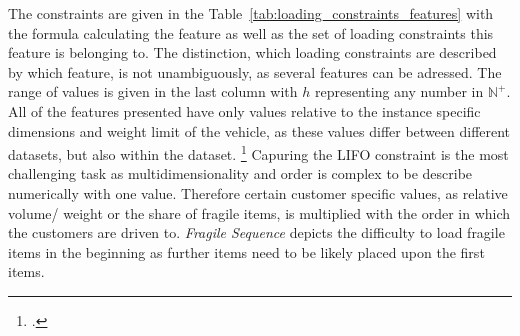 The constraints are given in the Table~\ref{tab:loading_constraints_features} with the formula calculating the feature as well as the set of
loading constraints this feature is belonging to. The distinction, which loading constraints are described by which feature, is not
unambiguously, as several features can be adressed. The range of values is given in the last column with $h$ representing any number in $\mathbb{N}^{+}$.
All of the features presented have only values relative to the instance specific dimensions and weight limit of the vehicle, as these values
differ between different datasets, but also within the \gendreauDataSetText dataset. \footcite[cf.][p. 346]{gendreau_tabu_2006}
Capuring the \gls{LIFO} constraint is the most challenging task as multidimensionality and order is complex to be describe numerically
with one value. Therefore certain customer specific values, as relative volume/ weight or the share of fragile items, is multiplied
with the order in which the customers are driven to. \textit{Fragile Sequence} depicts the difficulty to load fragile items
in the beginning as further items need to be likely placed upon the first items.

